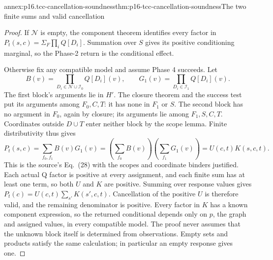 \begin{annexitem}{annex:p16.tcc-cancellation-soundness}{thm:p16-tcc-cancellation-soundness}{The two finite sums and valid cancellation}
\begin{proof}
If \(\mathcal N\) is empty, the component theorem identifies
every factor in \(P_t(s,c)=\Sigma_F\prod_i Q[D_i]\).
Summation over \(S\) gives its positive conditioning marginal,
so the Phase-2 return is the conditional effect.

Otherwise fix any compatible model and assume Phase 4 succeeds.
Let
\[
 B(v)=\prod_{D_i\in\mathcal N\cup\mathcal I_0}Q[D_i](v),
 \qquad G_1(v)=\prod_{D_i\in\mathcal I_1}Q[D_i](v).
\]
The first block's arguments lie in \(H'\). The closure theorem
and the success test put its arguments among \(F_0,C,T\):
it has none in \(F_1\) or \(S\). The second block has
no argument in \(F_0\), again by closure; its arguments lie
among \(F_1,S,C,T\). Coordinates outside \(D\cup T\)
enter neither block by the scope lemma. Finite distributivity thus
gives
\[
 P_t(s,c)=\sum_{f_0,f_1}B(v)G_1(v)
       =\left(\sum_{f_0}B(v)\right)
          \left(\sum_{f_1}G_1(v)\right)=U(c,t)K(s,c,t).
\]
This is the source's Eq.~(28) with the scopes and coordinate
binders justified. Each actual Q factor is positive at every
assignment, and each finite sum has at least one term, so both
\(U\) and \(K\) are positive. Summing over response values
gives \(P_t(c)=U(c,t)\sum_{s'}K(s',c,t)\). Cancellation
of the positive \(U\) is therefore valid, and the remaining
denominator is positive. Every factor in \(K\) has a known
component expression, so the returned conditional depends only
on \(p\), the graph and assigned values, in every compatible
model. The proof never assumes that the unknown block itself
is determined from observations. Empty sets and products satisfy
the same calculation; in particular an empty response gives one.
\end{proof}
\end{annexitem}

